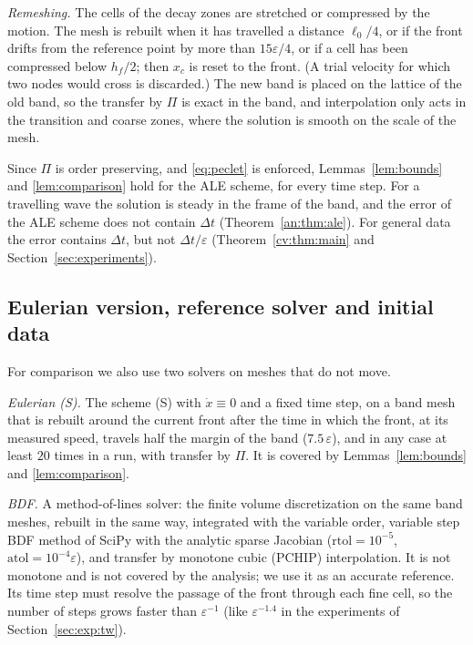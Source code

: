 \documentclass[11pt]{amsart}
\theoremstyle{definition}
\theoremstyle{remark}
\newcommand{\ve}{\varepsilon}
\begin{document}
\emph{Remeshing.} The cells of the decay zones are stretched or compressed by the
motion. The mesh is rebuilt when it has travelled a distance $\ell_0/4$, or if the front
drifts from the reference point by more than $15\ve/4$, or if a cell has been compressed
below $h_f/2$; then $x_c$ is reset to the
front. (A trial velocity for which two nodes would cross is discarded.) The new band is placed on the lattice of the old band, so the transfer by $\Pi$
is exact in the band, and interpolation only acts in the transition and coarse zones,
where the solution is smooth on the scale of the mesh.

Since $\Pi$ is order preserving, and \eqref{eq:peclet} is enforced,
Lemmas~\ref{lem:bounds} and \ref{lem:comparison} hold for the ALE scheme, for every time
step. For a travelling wave the solution is steady in the frame of the band, and
the error of the ALE scheme does not contain $\Delta t$ (Theorem~\ref{an:thm:ale}). For
general data the error contains $\Delta t$, but not $\Delta t/\ve$ (Theorem~\ref{cv:thm:main}
and Section~\ref{sec:experiments}).

\subsection{Eulerian version, reference solver and initial data}\label{sec:eulerian}

For comparison we also use two solvers on meshes that do not move.

\emph{Eulerian (S).} The scheme (S) with $\dot x\equiv0$ and a fixed time step, on a
band mesh that is rebuilt around the current front after the time in which the front,
at its measured speed, travels half the margin of the band ($7.5\,\ve$), and in any case
at least $20$ times in a run, with transfer by $\Pi$. It is covered by
Lemmas~\ref{lem:bounds} and \ref{lem:comparison}.

\emph{BDF.} A method-of-lines solver: the finite volume discretization on the same
band meshes, rebuilt in the same way, integrated with the variable order, variable
step BDF method of SciPy with the analytic sparse Jacobian
($\mathrm{rtol}=10^{-5}$, $\mathrm{atol}=10^{-4}\ve$), and transfer by monotone cubic
(PCHIP) interpolation. It is not monotone and is not covered by the analysis; we use
it as an accurate reference. Its time step must resolve the passage of the front
through each fine cell, so the number of steps grows faster than $\ve^{-1}$ (like
$\ve^{-1.4}$ in the experiments of Section~\ref{sec:exp:tw}).
\end{document}
